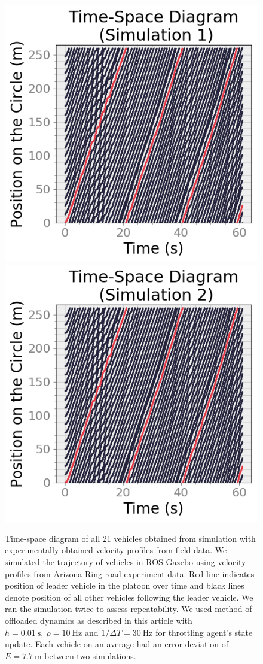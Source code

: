 \documentclass[aps,pra,twocolumn,notitlepage,nofootinbib,superscriptaddress]{revtex4-1}
\begin{document}
\begin{figure}[htpb]
\centering
    \includegraphics[clip,width=0.6\linewidth]{timespace_fs.png}
    \label{fig:timespace_fs1}
    \includegraphics[clip,width=0.6\linewidth]{timespace_fs_sim2.png}

    \caption{Time-space diagram of all 21 vehicles obtained from simulation with experimentally-obtained velocity profiles from field data. We simulated the trajectory of vehicles in ROS-Gazebo using velocity profiles from Arizona Ring-road experiment data. Red line indicates position of leader vehicle in the platoon over time and black lines denote position of all other vehicles following the leader vehicle. We ran the simulation twice to assess repeatability. We used method of offloaded dynamics as described in this article with  $h = 0.01~\textrm{s},~\rho = 10~\textrm{Hz}$  and $1/\Delta T = 30~\textrm{Hz}$ for throttling agent's state update. Each vehicle on an average had an error deviation of $ E = 7.7~\textrm{m}$ between two simulations.}

    \label{fig:timespace_fs}
\end{figure}
\end{document}
